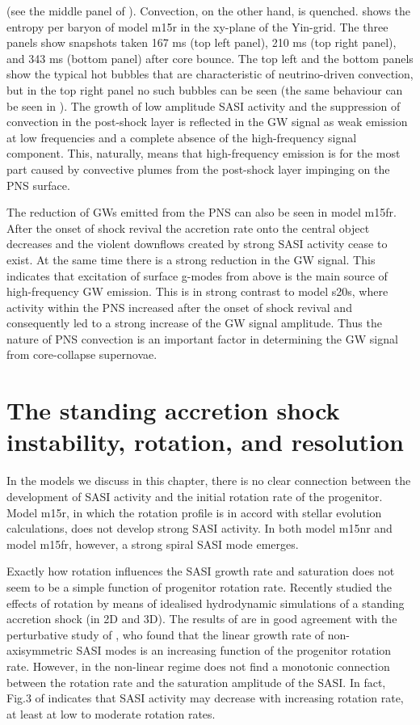(see the middle panel of ). Convection, on the other hand, is quenched. 
 shows the entropy per baryon of model m15r in the xy-plane of the Yin-grid.
The three panels show snapshots taken 167 ms (top left panel), 210 ms (top right panel), and 343 ms (bottom panel)
after core bounce. The top left and the bottom panels show the typical hot bubbles that are characteristic of
neutrino-driven convection, but in the top right panel no such bubbles can be seen (the same behaviour can be seen in
). 
The growth of low amplitude SASI activity and the suppression of convection in the post-shock layer is reflected
in the GW signal as weak emission at low frequencies and a complete absence of the high-frequency signal component.
This, naturally, means that high-frequency emission is for the most part caused by convective plumes from
the post-shock layer impinging on the PNS surface.

The reduction of GWs emitted from the PNS can also be seen in model m15fr. After the onset of shock revival
the accretion rate onto the central object decreases and the violent downflows created by strong SASI activity cease to exist. At the same time there is a strong reduction in the GW signal. This indicates
that excitation of surface g-modes from above is the main source of high-frequency GW emission.
This is in strong contrast to model s20s, where activity within the PNS increased after
the onset of shock revival and consequently led to a strong increase of the GW signal amplitude.
Thus the nature of PNS convection is an important factor in determining the 
GW signal from core-collapse supernovae.

\section{The standing accretion shock instability, rotation, and resolution}
In the models we discuss in this chapter, there is no clear connection between the development of SASI activity and the initial rotation rate of the progenitor. Model m15r, in which the rotation profile is in accord with stellar
evolution calculations, does not develop strong SASI activity. In both model m15nr and model m15fr, however, a strong spiral SASI mode emerges. 

Exactly how rotation influences the SASI growth rate and saturation does not seem to be a simple function of progenitor rotation rate. Recently \cite{blondin_17} studied the effects of rotation by means of idealised hydrodynamic simulations of a standing accretion shock (in 2D and 3D). 
The results of \cite{blondin_17} are in good agreement with the perturbative study of \cite{yamasaki_08}, 
who found that the linear growth rate 
of non-axisymmetric SASI modes is an increasing function of the progenitor rotation rate.
However, in the non-linear regime \cite{kazeroni_17} does not find a monotonic connection between the
rotation rate and the saturation amplitude of the SASI. In fact, Fig.3 of \cite{kazeroni_17} indicates that
SASI activity may decrease with increasing rotation rate, at least at low to moderate rotation rates. 

